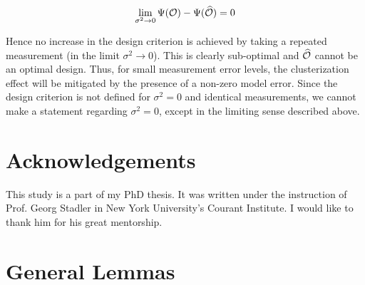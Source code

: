\documentclass{amsart}
\numberwithin{equation}{section}
\begin{document}
$$
\lim_{\sigma^2 \to 0} \Psi(\mathcal{O}) -\Psi(\widehat{\mathcal{O}}) = 0
$$

Hence no increase in the design criterion is achieved by taking a
repeated measurement (in the limit $\sigma^2 \to 0$). This is clearly
sub-optimal and $\widehat{\mathcal{O}}$ cannot be an optimal design. Thus, for small
measurement error levels, the clusterization effect will be mitigated
by the presence of a non-zero model error. Since the design criterion
is not defined for $\sigma^2 = 0$ and identical measurements, we
cannot make a statement regarding $\sigma^2 = 0$, except in the
limiting sense described above.




\section{Acknowledgements}
This study is a part of my PhD thesis. It was written under the
instruction of Prof. Georg Stadler in New York University's Courant
Institute. I would like to thank him for his great mentorship.

\appendix
\section{General Lemmas}
\end{document}

